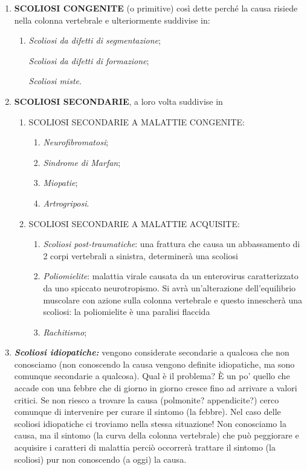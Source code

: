\begin{enumerate}
\def\labelenumi{\arabic{enumi}.}
\item
  \textbf{SCOLIOSI CONGENITE} (o primitive) così dette perché la causa
  risiede nella colonna vertebrale e ulteriormente suddivise in:

\begin{enumerate}
\def\labelenumi{\arabic{enumi}.}
\item
  \emph{Scoliosi da difetti di segmentazione};

  \emph{Scoliosi da difetti di formazione};

  \emph{Scoliosi miste}.
\end{enumerate}


\item
  \textbf{SCOLIOSI SECONDARIE}, a loro volta suddivise in

\begin{enumerate}
\def\labelenumi{\arabic{enumi}.}
\item
  SCOLIOSI SECONDARIE A MALATTIE CONGENITE:

\begin{enumerate}
\def\labelenumi{\arabic{enumi}.}
\item
  \emph{Neurofibromatosi};
\item 
  \emph{Sindrome di Marfan};
\item 
  \emph{Miopatie};
\item 
  \emph{Artrogriposi}.
\end{enumerate}


\item
  SCOLIOSI SECONDARIE A MALATTIE ACQUISITE:

\begin{enumerate}
\def\labelenumi{\arabic{enumi}.}
\item
  \emph{Scoliosi post-traumatiche}: una frattura che causa un
  abbassamento di 2 corpi vertebrali a sinistra, determinerà una
  scoliosi
\item
  \emph{Poliomielite}: malattia virale causata da un enterovirus
  caratterizzato da uno spiccato neurotropismo. Si avrà un'alterazione
  dell'equilibrio muscolare con azione sulla colonna vertebrale e questo
  innescherà una scoliosi: la poliomielite è una paralisi flaccida
\item
  \emph{Rachitismo};
\end{enumerate}
\end{enumerate}
\item
  \emph{\textbf{\emph{Scoliosi idiopatiche:}}} vengono considerate
  secondarie a qualcosa che non conosciamo (non conoscendo la causa
  vengono definite idiopatiche, ma sono comunque secondarie a qualcosa).
  Qual è il problema? È un po' quello che accade con una febbre che di
  giorno in giorno cresce fino ad arrivare a valori critici. Se non
  riesco a trovare la causa (polmonite? appendicite?) cerco comunque di
  intervenire per curare il sintomo (la febbre). Nel caso delle scoliosi
  idiopatiche ci troviamo nella stessa situazione! Non conosciamo la
  causa, ma il sintomo (la curva della colonna vertebrale) che può
  peggiorare e acquisire i caratteri di malattia perciò occorrerà
  trattare il sintomo (la scoliosi) pur non conoscendo (a oggi) la
  causa.


\end{enumerate}
